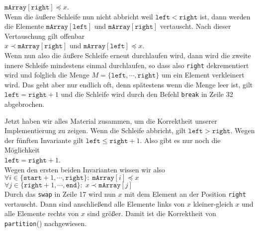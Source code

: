 \begin{enumerate}
      \hspace*{1.3cm} $\mathtt{mArray}[\mathtt{right}] \preceq x$. \\[0.2cm]
      Wenn die \"au{\ss}ere Schleife nun nicht abbricht weil $\texttt{left} < \mathtt{right}$ ist,
      dann werden die Elemente $\mathtt{mArray}[\mathtt{left}]$ und
      $\mathtt{mArray}[\mathtt{right}]$ vertauscht.  Nach dieser Vertauschung gilt 
      offenbar \\[0.2cm]
      \hspace*{1.3cm} 
      $x \prec \mathtt{mArray}[\mathtt{right}]$ \quad und \quad $\mathtt{mArray}[\mathtt{left}] \preceq x$. 
      \\[0.2cm]
      Wenn nun also die \"au{\ss}ere Schleife erneut durchlaufen wird, dann wird die zweite
      innere Schleife mindestens einmal durchlaufen, so dass also \texttt{right}
      dekrementiert wird und folglich die Menge $M = \{ \mathtt{left}, \cdots, \mathtt{right} \}$ 
      um ein Element verkleinert wird.  Das geht aber nur endlich oft, denn sp\"atestens
      wenn die Menge leer ist, gilt $\mathtt{left} = \mathtt{right} + 1$
      und die Schleife wird durch den Befehl \texttt{break} in Zeile 32 abgebrochen. 
\end{enumerate}
Jetzt haben wir alles Material zusammen, um die Korrektheit unserer Implementierung zu zeigen.
Wenn die Schleife abbricht, gilt $\mathtt{left} > \mathtt{right}$.  Wegen der f\"unften
Invariante gilt $\texttt{left} \leq \mathtt{right} + 1$.  Also gibt es nur noch die
M\"oglichkeit
\\[0.2cm]
\hspace*{1.3cm}
$\texttt{left} = \mathtt{right} +
1$.
\\[0.2cm]  
Wegen den ersten beiden Invarianten
wissen wir also \\[0.2cm]
\hspace*{1.3cm} 
 $\forall i \in \{ \mathtt{start}+1, \cdots, \mathtt{right} \} \colon\; \mathtt{mArray}[i] \preceq x$ \\[0.2cm]
\hspace*{1.3cm} 
 $\forall j \in \{ \mathtt{right}+1, \cdots, \mathtt{end} \} \colon\; x \prec \mathtt{mArray}[j]$
\\[0.2cm]
Durch das \texttt{swap} in Zeile 17 wird nun $x$ mit dem Element an der Position
\texttt{right} vertauscht.  Dann sind anschlie{\ss}end alle Elemente links von $x$
kleiner-gleich $x$ und alle Elemente rechts von $x$ sind gr\"o{\ss}er.
Damit ist die Korrektheit von \texttt{partition}() nachgewiesen.

